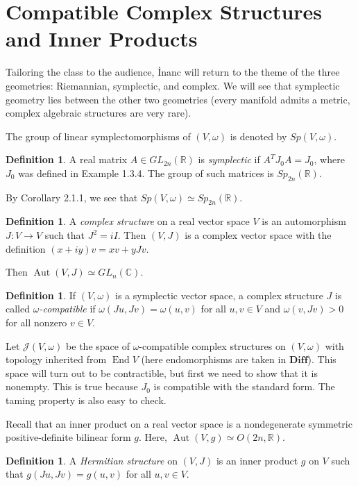 \documentclass[leqno, openany]{memoir}
\theoremstyle{definition}
\newtheorem{defn}[thm]{Definition}
\theoremstyle{remark}
\theoremstyle{plain}
\theoremstyle{definition}
\theoremstyle{remark}
\newcommand{\R}{\mathbb{R}}
\renewcommand{\C}{\mathbb{C}}
\newcommand{\mc}[1]{\mathcal{#1}}
\DeclareMathOperator{\End}{End}
\DeclareMathOperator{\Aut}{Aut}
\begin{document}
\section{Compatible Complex Structures and Inner Products}%
\label{sec:compatible_complex_structures_and_inner_products}

Tailoring the class to the audience, \.Inanc will return to the theme of the three geometries: Riemannian, symplectic, and complex. We will see that symplectic geometry lies between the other two geometries (every manifold admits a metric, complex algebraic structures are very rare).

The group of linear symplectomorphisms of $(V, \omega)$ is denoted by $Sp(V, \omega)$.
\begin{defn}
    A real matrix $A \in GL_{2n}(\R)$ is \textit{symplectic} if $A^T J_0 A = J_0$, where $J_0$ was defined in Example 1.3.4. The group of such matrices is $Sp_{2n}(\R)$.
\end{defn}

By Corollary 2.1.1, we see that $Sp(V, \omega) \simeq Sp_{2n}(\R)$.

\begin{defn}
    A \textit{complex structure} on a real vector space $V$ is an automorphism $J: V \to V$ such that $J^2 = iI$. Then $(V, J)$ is a complex vector space with the definition $(x+iy) v = x v + yJv$.
\end{defn}
Then $\Aut(V, J) \simeq GL_n(\C)$.

\begin{defn}
    If $(V, \omega)$ is a symplectic vector space, a complex structure $J$ is called \textit{$\omega$-compatible} if $\omega(Ju, Jv) = \omega(u,v)$ for all $u,v \in V$ and $\omega(v, Jv) > 0$ for all nonzero $v \in V$.
\end{defn}
Let $\mc{J}(V, \omega)$ be the space of $\omega$-compatible complex structures on $(V, \omega)$ with topology inherited from $\End V$ (here endomorphisms are taken in $\mathbf{Diff}$). This space will turn out to be contractible, but first we need to show that it is nonempty. This is true because $J_0$ is compatible with the standard form. The taming property is also easy to check.

Recall that an inner product on a real vector space is a nondegenerate symmetric positive-definite bilinear form $g$. Here, $\Aut(V,g) \simeq O(2n, \R)$.
\begin{defn}
    A \textit{Hermitian structure} on $(V,J)$ is an inner product $g$ on $V$ such that $g(Ju, Jv) = g(u, v)$ for all $u,v \in V$.
\end{defn}
\end{document}
